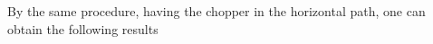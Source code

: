 \documentclass[12pt]{book}
\begin{document}
By the same procedure, having the chopper in the horizontal path, one can obtain the following results 
\end{document}

